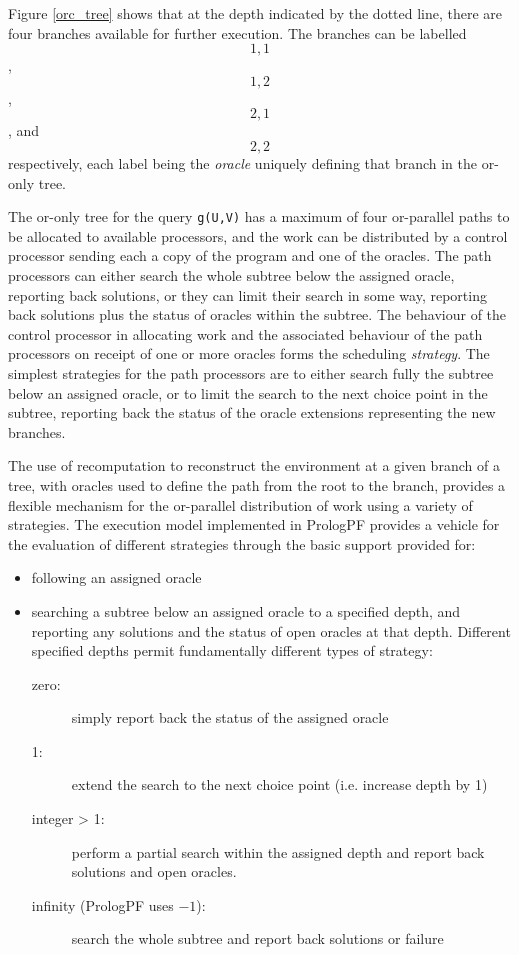 Figure \ref{orc_tree} shows that at the depth indicated by the dotted line, there are
four branches available for further execution.  The branches can be labelled
\[1,1\], \[1,2\],\[2,1\], and \[2,2\] respectively, each label being the \textit{oracle}
uniquely defining that branch in the or-only tree.

The or-only tree for the query \texttt{g(U,V)} has a maximum of four or-parallel paths
to be allocated to available processors, and the work can be distributed by a control
processor sending each a copy of the program and one of the oracles.  The path processors
can either search the whole subtree below the assigned oracle, reporting back solutions,
or they can limit their search in some way, reporting back solutions plus the status
of oracles within the subtree.  The behaviour of the control processor in allocating
work and the associated behaviour of the path processors on receipt of one or more
oracles forms the scheduling \textit{strategy}.  The simplest strategies for the path
processors are to either search fully the subtree below an assigned oracle, or to
limit the search to the next choice point in the subtree, reporting back the status of
the oracle extensions representing the new branches.

The use of recomputation to reconstruct the environment at a given branch of a tree,
with oracles used to define the path from the root to the branch, provides a 
flexible mechanism for the or-parallel distribution of work using a variety of
strategies.  The execution model implemented in PrologPF provides a vehicle for the
evaluation of different strategies through the basic support provided for:
\begin{itemize}
\item{following an assigned oracle}
\item{searching a subtree below an assigned oracle to a specified depth, and
  reporting any solutions and the status of open oracles at that depth.  Different
  specified depths permit fundamentally different types of strategy:
  \begin{description}
  \item[zero:]{ simply report back the status of the assigned oracle}
  \item[1:]{ extend the search to the next choice point (i.e. increase depth by 1)}
  \item[integer > 1:]{ perform a partial search within the assigned depth
    and report back solutions and open
    oracles.}
  \item[infinity (PrologPF uses $-1$):]{ search the whole subtree and report back
    solutions or failure}
  \end{description}}
\end{itemize}


